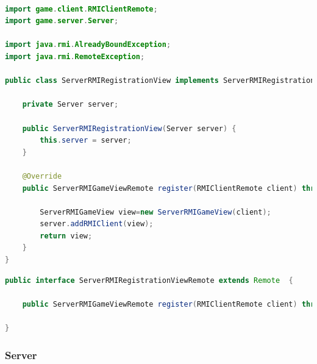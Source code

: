 \documentclass{article}
\begin{document}
\begin{lstlisting}[language=Java,escapechar=|]

import game.client.RMIClientRemote;
import game.server.Server;

import java.rmi.AlreadyBoundException;
import java.rmi.RemoteException;

public class ServerRMIRegistrationView implements ServerRMIRegistrationViewRemote {

	private Server server;

	public ServerRMIRegistrationView(Server server) {
		this.server = server;
	}

	@Override
	public ServerRMIGameViewRemote register(RMIClientRemote client) throws RemoteException, AlreadyBoundException {
		
		ServerRMIGameView view=new ServerRMIGameView(client);
		server.addRMIClient(view);
		return view;
	}
}
\end{lstlisting}

\begin{lstlisting}[language=Java,escapechar=|]
public interface ServerRMIRegistrationViewRemote extends Remote  {
	
	public ServerRMIGameViewRemote register(RMIClientRemote client) throws RemoteException, AlreadyBoundException;

}
\end{lstlisting}

\subsubsection{Server}
\end{document}
